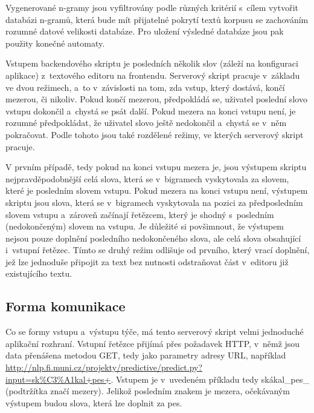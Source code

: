 \documentclass[a4paper,11pt,openany]{book} %
\newcommand\exmp{\textsf}
\begin{document}

Vygenerované n-gramy jsou vyfiltrovány podle různých kritérií s~cílem vytvořit databázi n-gramů, která bude mít přijatelné pokrytí textů korpusu se zachováním rozumné datové velikosti databáze. Pro uložení výsledné databáze jsou pak použity konečné automaty. \parencite[13]{neverilovaulipova2014}



Vstupem backendového skriptu je posledních několik slov (záleží na konfiguraci aplikace) z~textového editoru na frontendu. Serverový skript pracuje v~základu ve dvou režimech, a~to v~závislosti na tom, zda vstup, který dostává, končí mezerou, či nikoliv. Pokud končí mezerou, předpokládá se, uživatel poslední slovo vstupu dokončil a~chystá se psát další. Pokud mezera na konci vstupu není, je rozumné předpokládat, že uživatel slovo ještě nedokončil a~chystá se v~něm pokračovat. Podle tohoto jsou také rozdělené režimy, ve kterých serverový skript pracuje. 

V prvním případě, tedy pokud na konci vstupu mezera je, jsou výstupem skriptu nejpravděpodobnější celá slova, která se v~bigramech vyskytovala za slovem, které je posledním slovem vstupu. Pokud mezera na konci vstupu není, výstupem skriptu jsou slova, která se v~bigramech vyskytovala na pozici za předposledním slovem vstupu a~zároveň začínají řetězcem, který je shodný s~posledním (nedokončeným) slovem na vstupu. Je důležité si povšimnout, že výstupem nejsou pouze doplnění posledního nedokončeného slova, ale celá slova obsahující i~vstupní řetězec. Tímto se druhý režim odlišuje od prvního, který vrací doplnění, jež lze jednoduše připojit za text bez nutnosti odstraňovat část v~editoru již existujícího textu.

\subsection{Forma komunikace}

Co se formy vstupu a~výstupu týče, má tento serverový skript velmi jednoduché aplikační rozhraní. Vstupní řetězce přijímá přes požadavek HTTP, v~němž jsou data přenášena metodou GET, tedy jako parametry adresy URL, například \url{http://nlp.fi.muni.cz/projekty/predictive/predict.py?input=sk%C3%A1kal+pes+}. Vstupem je v~uvedeném příkladu tedy \exmp{skákal\_pes\_} (podtržítka značí mezery). Jelikož posledním znakem je mezera, očekávaným výstupem budou slova, která lze doplnit za \exmp{pes}. 
\end{document}
